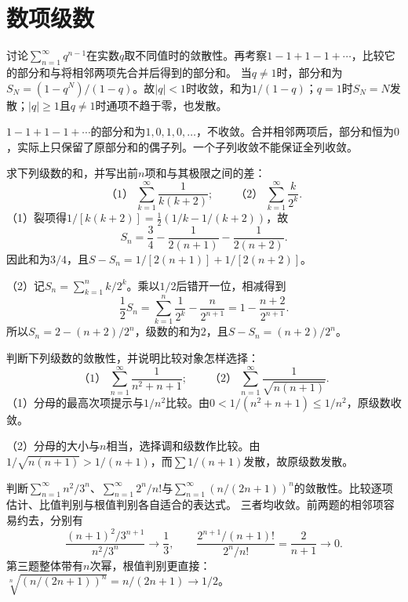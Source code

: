 \par\addvspace{12pt}

\section{数项级数}

\label{sol:sec:analysis:6}

讨论\(\sum_{n=1}^{\infty}q^{n-1}\)在实数\(q\)取不同值时的敛散性。再考察\(1-1+1-1+\cdots\)，比较它的部分和与将相邻两项先合并后得到的部分和。
\solutionanswer
当\(q\ne1\)时，部分和为\(S_N=(1-q^N)/(1-q)\)。故\(|q|<1\)时收敛，和为\(1/(1-q)\)；\(q=1\)时\(S_N=N\)发散；\(|q|\ge1\)且\(q\ne1\)时通项不趋于零，也发散。

\(1-1+1-1+\cdots\)的部分和为\(1,0,1,0,\ldots\)，不收敛。合并相邻两项后，部分和恒为\(0\)，实际上只保留了原部分和的偶子列。一个子列收敛不能保证全列收敛。


求下列级数的和，并写出前\(n\)项和与其极限之间的差：
\begin{equation*}
 \text{（1）}\ \sum_{k=1}^{\infty}\frac1{k(k+2)};
 \qquad
 \text{（2）}\ \sum_{k=1}^{\infty}\frac{k}{2^k}.
\end{equation*}
\solutionanswer
（1）裂项得\(1/[k(k+2)]=\tfrac12(1/k-1/(k+2))\)，故
\[
S_n=\frac34-\frac1{2(n+1)}-\frac1{2(n+2)}.
\]
因此和为\(3/4\)，且\(S-S_n=1/[2(n+1)]+1/[2(n+2)]\)。

（2）记\(S_n=\sum_{k=1}^nk/2^k\)。乘以\(1/2\)后错开一位，相减得到
\[
\frac12 S_n=\sum_{k=1}^n\frac1{2^k}-\frac n{2^{n+1}}
=1-\frac{n+2}{2^{n+1}}.
\]
所以\(S_n=2-(n+2)/2^n\)，级数的和为\(2\)，且\(S-S_n=(n+2)/2^n\)。


判断下列级数的敛散性，并说明比较对象怎样选择：
\begin{equation*}
 \text{（1）}\ \sum_{n=1}^{\infty}\frac1{n^2+n+1};
 \qquad
 \text{（2）}\ \sum_{n=1}^{\infty}\frac1{\sqrt{n(n+1)}}.
\end{equation*}
\solutionanswer
（1）分母的最高次项提示与\(1/n^2\)比较。由\(0<1/(n^2+n+1)\le1/n^2\)，原级数收敛。

（2）分母的大小与\(n\)相当，选择调和级数作比较。由\(1/\sqrt{n(n+1)}>1/(n+1)\)，而\(\sum1/(n+1)\)发散，故原级数发散。


判断\(\sum_{n=1}^{\infty}n^2/3^n\)、\(\sum_{n=1}^{\infty}2^n/n!\)与\(\sum_{n=1}^{\infty}(n/(2n+1))^n\)的敛散性。比较逐项估计、比值判别与根值判别各自适合的表达式。
\solutionanswer
三者均收敛。前两题的相邻项容易约去，分别有
\[
\frac{(n+1)^2/3^{n+1}}{n^2/3^n}\to\frac13,
\qquad
\frac{2^{n+1}/(n+1)!}{2^n/n!}=\frac2{n+1}\to0.
\]
第三题整体带有\(n\)次幂，根值判别更直接：\(\sqrt[n]{(n/(2n+1))^n}=n/(2n+1)\to1/2\)。

